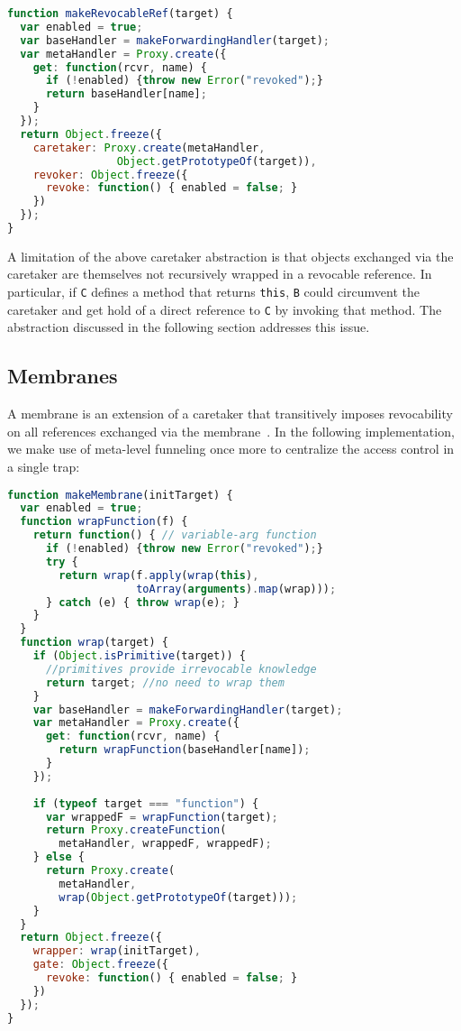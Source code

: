 \documentclass{acm_proc_article-sp}
\begin{document}
\begin{lstlisting}[language=javascript]
function makeRevocableRef(target) {
  var enabled = true;
  var baseHandler = makeForwardingHandler(target);
  var metaHandler = Proxy.create({
    get: function(rcvr, name) {
      if (!enabled) {throw new Error("revoked");}
      return baseHandler[name];
    }
  });
  return Object.freeze({
    caretaker: Proxy.create(metaHandler, 
                 Object.getPrototypeOf(target)),
    revoker: Object.freeze({
      revoke: function() { enabled = false; }
    })
  });
}
\end{lstlisting}


A limitation of the above caretaker abstraction is that objects exchanged via the caretaker are themselves not recursively wrapped in a revocable reference. In particular, if \texttt{C} defines a method that returns \texttt{this}, \texttt{B} could circumvent the caretaker and get hold of a direct reference to \texttt{C} by invoking that method. The abstraction discussed in the following section addresses this issue.

\subsection{Membranes}
\label{sub:membranes}

A membrane is an extension of a caretaker that transitively imposes revocability on all references exchanged via the membrane~\cite{robust_composition}. In the following implementation, we make use of meta-level funneling once more to centralize the access control in a single trap:

\begin{lstlisting}[language=javascript]
function makeMembrane(initTarget) {
  var enabled = true;
  function wrapFunction(f) {
    return function() { // variable-arg function
      if (!enabled) {throw new Error("revoked");}
      try {
        return wrap(f.apply(wrap(this),
                    toArray(arguments).map(wrap)));
      } catch (e) { throw wrap(e); } 
    }
  }
  function wrap(target) {
    if (Object.isPrimitive(target)) {
      //primitives provide irrevocable knowledge
      return target; //no need to wrap them
    } 
    var baseHandler = makeForwardingHandler(target);
    var metaHandler = Proxy.create({
      get: function(rcvr, name) {
        return wrapFunction(baseHandler[name]);
      }
    });
    
    if (typeof target === "function") {
      var wrappedF = wrapFunction(target);
      return Proxy.createFunction(
        metaHandler, wrappedF, wrappedF);
    } else {
      return Proxy.create(
        metaHandler,
        wrap(Object.getPrototypeOf(target)));
    }
  }
  return Object.freeze({
    wrapper: wrap(initTarget),
    gate: Object.freeze({
      revoke: function() { enabled = false; }
    })
  });
}
\end{lstlisting}
\end{document}
